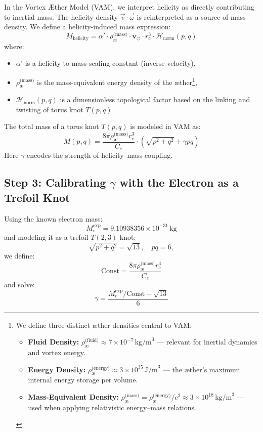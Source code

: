 \documentclass[12pt]{article}
\begin{document}
In the Vortex Æther Model (VAM), we interpret helicity as directly contributing to inertial mass. The helicity density \( \vec{v} \cdot \vec{\omega} \) is reinterpreted as a source of mass density. We define a helicity-induced mass expression:
\[
M_{\text{helicity}} = \alpha' \cdot \rho_\text{\ae}^{\text{(mass)}} \cdot \mathbf{v}_{\scriptscriptstyle\boldsymbol{\circlearrowleft}} \cdot r_c^3 \cdot \mathcal{H}_{\text{norm}}(p,q)
\tag{2}
\]
where:
\begin{itemize}
    \item \( \alpha' \) is a helicity-to-mass scaling constant (inverse velocity),
    \item \( \rho_\text{\ae}^{\text{(mass)}} \) is the mass-equivalent energy density of the æther\footnote{We define three distinct æther densities central to VAM:

\begin{itemize}
    \item \textbf{Fluid Density:} \( \rho_\text{\ae}^{\text{(fluid)}} \approx 7 \times 10^{-7} \, \text{kg/m}^3 \) — relevant for inertial dynamics and vortex energy.
    \item \textbf{Energy Density:} \( \rho_\text{\ae}^{\text{(energy)}} \approx 3 \times 10^{35} \, \text{J/m}^3 \) — the æther’s maximum internal energy storage per volume.
    \item \textbf{Mass-Equivalent Density:} \( \rho_\text{\ae}^{\text{(mass)}} = \rho_\text{\ae}^{\text{(energy)}} / c^2 \approx 3 \times 10^{18} \, \text{kg/m}^3 \) — used when applying relativistic energy–mass relations.
\end{itemize}
},
    \item \( \mathcal{H}_{\text{norm}}(p,q) \) is a dimensionless topological factor based on the linking and twisting of torus knot \( T(p,q) \).
\end{itemize}

The total mass of a torus knot \( T(p,q) \) is modeled in VAM as:
\[
M(p,q) = \frac{8\pi \rho_\text{\ae}^{\text{(mass)}} r_c^3}{C_e} \cdot \left( \sqrt{p^2 + q^2} + \gamma pq \right)
\tag{3}
\]
Here \( \gamma \) encodes the strength of helicity–mass coupling.

\subsection*{Step 3: Calibrating \( \gamma \) with the Electron as a Trefoil Knot}

Using the known electron mass:
\[
M_e^{\text{exp}} = 9.10938356 \times 10^{-31} \, \text{kg}
\]
and modeling it as a trefoil \( T(2,3) \) knot:
\[
\sqrt{p^2 + q^2} = \sqrt{13}, \quad pq = 6,
\]
we define:
\[
\text{Const} = \frac{8\pi \rho_\text{\ae}^{\text{(mass)}} r_c^3}{C_e}
\]
and solve:
\[
\gamma = \frac{M_e^{\text{exp}} / \text{Const} - \sqrt{13}}{6}
\]
\end{document}
